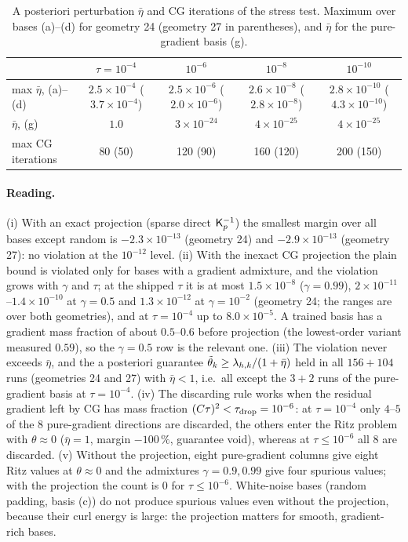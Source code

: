 \begin{table}[t]
\centering
\caption{A posteriori perturbation $\bar\eta$ and CG iterations of the stress test. Maximum over bases (a)--(d) for geometry 24 (geometry 27 in parentheses), and $\bar\eta$ for the pure-gradient basis (g).}
\label{tab:A04-eta}
\scriptsize
\setlength{\tabcolsep}{3pt}
\begin{tabular}{@{}lcccc@{}}
\toprule
 & $\tau=10^{-4}$ & $10^{-6}$ & $10^{-8}$ & $10^{-10}$ \\
\midrule
max $\bar\eta$, (a)--(d) & $2.5\!\times\!10^{-4}$ ($3.7\!\times\!10^{-4}$) & $2.5\!\times\!10^{-6}$ ($2.0\!\times\!10^{-6}$) & $2.6\!\times\!10^{-8}$ ($2.8\!\times\!10^{-8}$) & $2.8\!\times\!10^{-10}$ ($4.3\!\times\!10^{-10}$) \\
$\bar\eta$, (g) & $1.0$ & $3\!\times\!10^{-24}$ & $4\!\times\!10^{-25}$ & $4\!\times\!10^{-25}$ \\
max CG iterations & 80 (50) & 120 (90) & 160 (120) & 200 (150) \\
\bottomrule
\end{tabular}
\end{table}

\paragraph{Reading.}
(i) With an exact projection (sparse direct $\Kp^{-1}$) the smallest margin over all bases except random is $-2.3\times10^{-13}$ (geometry 24) and $-2.9\times10^{-13}$ (geometry 27): no violation at the $10^{-12}$ level.
(ii) With the inexact CG projection the plain bound is violated only for bases with a gradient admixture, and the violation grows with $\gamma$ and $\tau$; at the shipped $\tau$ it is at most $1.5\times10^{-8}$ ($\gamma=0.99$), $2\times10^{-11}$--$1.4\times10^{-10}$ at $\gamma=0.5$ and $1.3\times10^{-12}$ at $\gamma=10^{-2}$ (geometry 24; the ranges are over both geometries), and at $\tau=10^{-4}$ up to $8.0\times10^{-5}$.
A trained basis has a gradient mass fraction of about $0.5$--$0.6$ before projection (the lowest-order variant measured $0.59$), so the $\gamma=0.5$ row is the relevant one.
(iii) The violation never exceeds $\bar\eta$, and the a posteriori guarantee $\tilde\theta_k\ge\lamh_k/(1+\bar\eta)$ held in all $156+104$ runs (geometries 24 and 27) with $\bar\eta<1$, i.e.\ all except the $3+2$ runs of the pure-gradient basis at $\tau=10^{-4}$.
(iv) The discarding rule works when the residual gradient left by CG has mass fraction $(C\tau)^2<\tau_{\rm drop}=10^{-6}$: at $\tau=10^{-4}$ only $4$--$5$ of the $8$ pure-gradient directions are discarded, the others enter the Ritz problem with $\theta\approx0$ ($\bar\eta=1$, margin $-100\,\%$, guarantee void), whereas at $\tau\le10^{-6}$ all $8$ are discarded.
(v) Without the projection, eight pure-gradient columns give eight Ritz values at $\theta\approx0$ and the admixtures $\gamma=0.9,0.99$ give four spurious values; with the projection the count is $0$ for $\tau\le10^{-6}$.
White-noise bases (random padding, basis (c)) do not produce spurious values even without the projection, because their curl energy is large: the projection matters for smooth, gradient-rich bases.
